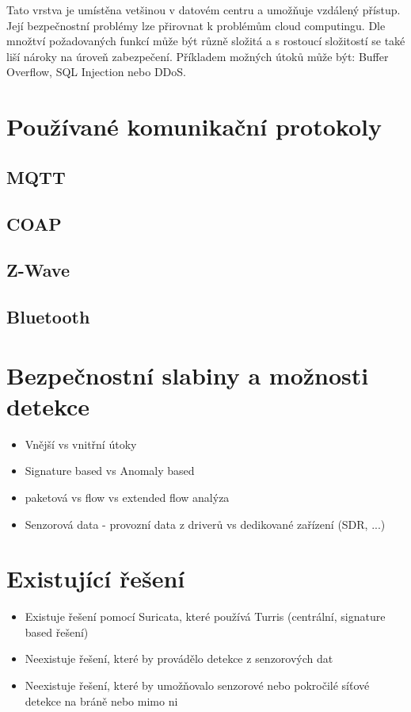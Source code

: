  Tato vrstva je umístěna vetšinou v datovém centru a umožňuje vzdálený přístup. 
 Její bezpečnostní problémy lze přirovnat k problémům cloud computingu. Dle
 množtví požadovaných funkcí může být různě složitá a s rostoucí složitostí
 se také liší nároky na úroveň zabezpečení. Příkladem možných útoků může být:
 Buffer Overflow, SQL Injection nebo DDoS.
 
 \section{Používané komunikační protokoly} \label{protokoly}
  \subsection{MQTT}
  \subsection{COAP}
  \subsection{Z-Wave}
  \subsection{Bluetooth}
 \section{Bezpečnostní slabiny a možnosti detekce}
 \begin{itemize}
 \item Vnější vs vnitřní útoky
 \item Signature based vs Anomaly based
 \item paketová vs flow vs extended flow analýza
 \item Senzorová data - provozní data z driverů vs dedikované zařízení (SDR, ...)
\end{itemize}

 \section{Existující řešení}
  \begin{itemize}
 \item Existuje řešení pomocí Suricata, které používá Turris (centrální, signature
 based řešení)
 \item Neexistuje řešení, které by provádělo detekce z senzorových dat
 \item Neexistuje řešení, které by umožňovalo senzorové nebo pokročilé síťové
 detekce na bráně nebo mimo ni
\end{itemize}
